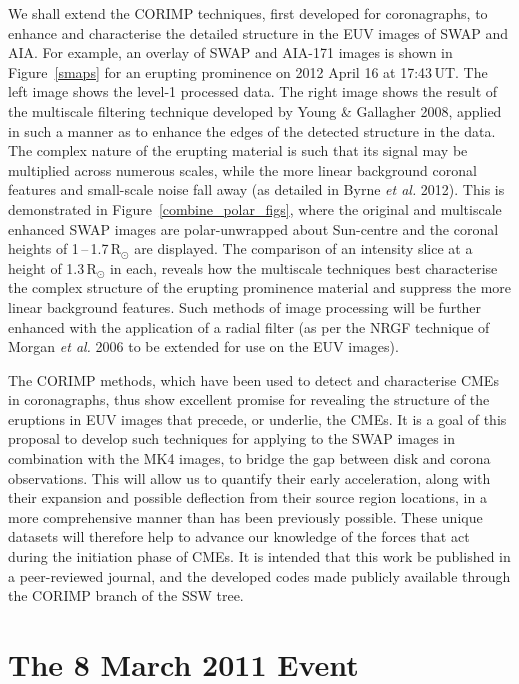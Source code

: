 \documentclass[preprint2]{aastex}
\begin{document}
We shall extend the CORIMP techniques, first developed for coronagraphs, to enhance and characterise the detailed structure in the EUV images of SWAP and AIA. For example, an overlay of SWAP and AIA-171 images is shown in Figure~\ref{smaps} for an erupting prominence on 2012 April 16 at 17:43\,UT. The left image shows the level-1 processed data. The right image shows the result of the multiscale filtering technique developed by Young \& Gallagher 2008, applied in such a manner as to enhance the edges of the detected structure in the data. The complex nature of the erupting material is such that its signal may be multiplied across numerous scales, while the more linear background coronal features and small-scale noise fall away (as detailed in Byrne \emph{et al.} 2012). This is demonstrated in Figure~\ref{combine_polar_figs}, where the original and multiscale enhanced SWAP images are polar-unwrapped about Sun-centre and the coronal heights of 1\,--\,1.7\,R$_\odot$ are displayed. The comparison of an intensity slice at a height of 1.3\,R$_\odot$ in each, reveals how the multiscale techniques best characterise the complex structure of the erupting prominence material and suppress the more linear background features. Such methods of image processing will be further enhanced with the application of a radial filter (as per the NRGF technique of Morgan \emph{et al.} 2006 to be extended for use on the EUV images).


The CORIMP methods, which have been used to detect and characterise CMEs in coronagraphs, thus show excellent promise for revealing the structure of the eruptions in EUV images that precede, or underlie, the CMEs. It is a goal of this proposal to develop such techniques for applying to the SWAP images in combination with the MK4 images, to bridge the gap between disk and corona observations. This will allow us to quantify their early acceleration, along with their expansion and possible deflection from their source region locations, in a more comprehensive manner than has been previously possible. These unique datasets will therefore help to advance our knowledge of the forces that act during the initiation phase of CMEs. It is intended that this work be published in a peer-reviewed journal, and the developed codes made publicly available through the CORIMP branch of the SSW tree.


\section{The 8 March 2011 Event}
\end{document}
